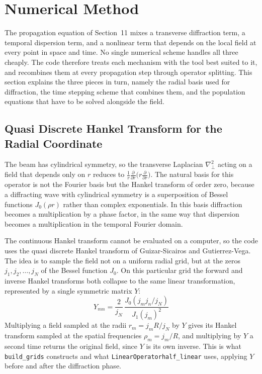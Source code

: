 \section{Numerical Method}

The propagation equation of Section~11 mixes a transverse diffraction term, a temporal dispersion term, and a nonlinear term that depends on the local field at every point in space and time. No single numerical scheme handles all three cheaply. The code therefore treats each mechanism with the tool best suited to it, and recombines them at every propagation step through operator splitting. This section explains the three pieces in turn, namely the radial basis used for diffraction, the time stepping scheme that combines them, and the population equations that have to be solved alongside the field.

\subsection{Quasi Discrete Hankel Transform for the Radial Coordinate}

The beam has cylindrical symmetry, so the transverse Laplacian $\nabla_\perp^2$ acting on a field that depends only on $r$ reduces to $\frac{1}{r}\frac{\partial}{\partial r}\big(r\frac{\partial}{\partial r}\big)$. The natural basis for this operator is not the Fourier basis but the Hankel transform of order zero, because a diffracting wave with cylindrical symmetry is a superposition of Bessel functions $J_0(\rho r)$ rather than complex exponentials. In this basis diffraction becomes a multiplication by a phase factor, in the same way that dispersion becomes a multiplication in the temporal Fourier domain.

The continuous Hankel transform cannot be evaluated on a computer, so the code uses the quasi discrete Hankel transform of Guizar-Sicairos and Gutierrez-Vega. The idea is to sample the field not on a uniform radial grid, but at the zeros $j_1, j_2, \dots, j_N$ of the Bessel function $J_0$. On this particular grid the forward and inverse Hankel transforms both collapse to the same linear transformation, represented by a single symmetric matrix $Y$:
\begin{equation}
Y_{mn} = \frac{2}{j_N}\,\frac{J_0(j_mj_n/j_N)}{J_1(j_m)^2}
\end{equation}
Multiplying a field sampled at the radii $r_m = j_m R/j_N$ by $Y$ gives its Hankel transform sampled at the spatial frequencies $\rho_m = j_m/R$, and multiplying by $Y$ a second time returns the original field, since $Y$ is its own inverse. This is what \texttt{build\_grids} constructs and what \texttt{LinearOperator\dotb half\_linear} uses, applying $Y$ before and after the diffraction phase.

